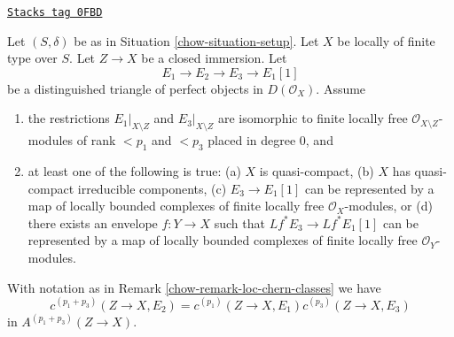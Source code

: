 \begin{lemma}
\label{chow-lemma-additivity-loc-chern-c}
\href{https://stacks.math.columbia.edu/tag/0FBD}{\texttt{Stacks tag 0FBD}}

Let $(S, \delta)$ be as in Situation \ref{chow-situation-setup}.
Let $X$ be locally of finite type over $S$. Let $Z \to X$ be
a closed immersion. Let
$$
E_1 \to E_2 \to E_3 \to E_1[1]
$$
be a distinguished triangle of perfect objects in $D(\mathcal{O}_X)$.
Assume
\begin{enumerate}
\item the restrictions $E_1|_{X \setminus Z}$ and $E_3|_{X \setminus Z}$
are isomorphic to finite locally free $\mathcal{O}_{X \setminus Z}$-modules
of rank $< p_1$ and $< p_3$ placed in degree $0$, and
\item at least one of the following is true:
(a) $X$ is quasi-compact,
(b) $X$ has quasi-compact irreducible components,
(c) $E_3 \to E_1[1]$ can be represented by a map of locally
bounded complexes of finite locally free $\mathcal{O}_X$-modules, or
(d) there exists an envelope $f : Y \to X$ such that $Lf^*E_3 \to Lf^*E_1[1]$
can be represented by a map of locally bounded complexes of
finite locally free $\mathcal{O}_Y$-modules.
\end{enumerate}
With notation as in Remark \ref{chow-remark-loc-chern-classes} we have
$$
c^{(p_1 + p_3)}(Z \to X, E_2) = c^{(p_1)}(Z \to X, E_1)c^{(p_3)}(Z \to X, E_3)
$$
in $A^{(p_1 + p_3)}(Z \to X)$.
\end{lemma}

